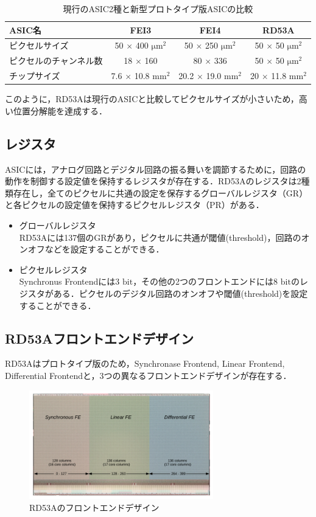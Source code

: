 \begin{table}[h]
  \centering
  \caption{現行のASIC2種と新型プロトタイプ版ASICの比較}
  \begin{tabular} {|l|cc|c|} \hline
    ASIC名 & FEI3 & FEI4 & RD53A \\ \hline \hline
    ピクセルサイズ & 50 $\times$ 400 $\mathrm{\mu m^2}$ & 50 $\times$ 250 $\mathrm{\mu m^2}$ & 50 $\times$ 50 $\mathrm{\mu m^2}$ \\
    ピクセルのチャンネル数 & 18 $\times$ 160 & 80 $\times$ 336 & 50 $\times$ 50 $\mathrm{\mu m^2}$ \\ 
    チップサイズ & 7.6 $\times$ 10.8 $\mathrm{mm^2}$ & 20.2 $\times$ 19.0 $\mathrm{mm^2}$ & 20 $\times$ 11.8 $\mathrm{mm^2}$\\ \hline
  \end{tabular}
  \label{tab:ASIC}
\end{table}

このように，RD53Aは現行のASICと比較してピクセルサイズが小さいため，高い位置分解能を達成する．

\subsection{レジスタ}
ASICには，アナログ回路とデジタル回路の振る舞いを調節するために，回路の動作を制御する設定値を保持するレジスタが存在する．RD53Aのレジスタは2種類存在し，全てのピクセルに共通の設定を保存するグローバルレジスタ（GR）と各ピクセルの設定値を保持するピクセルレジスタ（PR）がある．
\begin{itemize}
\item グローバルレジスタ\\
  RD53Aには137個のGRがあり，ピクセルに共通が閾値(threshold)，回路のオンオフなどを設定することができる．
\item ピクセルレジスタ\\
  Synchronus Frontendには3 $\mathrm{bit}$，その他の2つのフロントエンドには8 $\mathrm{bit}$のレジスタがある．ピクセルのデジタル回路のオンオフや閾値(threshold)を設定することができる．
\end{itemize}


\subsection{RD53Aフロントエンドデザイン}
RD53Aはプロトタイプ版のため，Synchronase Frontend, Linear Frontend, Differential Frontendと，3つの異なるフロントエンドデザインが存在する．

\begin{figure}[h]
\centering
\includegraphics[width=8cm]{./figure/RD53A_FE.png}
\caption{RD53Aのフロントエンドデザイン}
\label{fig:RD53AFE}
\end{figure}


